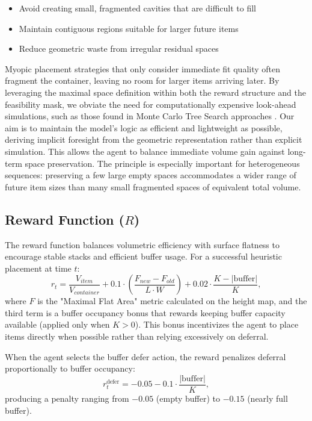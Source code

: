 \documentclass[runningheads]{llncs}
\begin{document}
\begin{itemize}

    \item Avoid creating small, fragmented cavities that are difficult to fill

    \item Maintain contiguous regions suitable for larger future items

    \item Reduce geometric waste from irregular residual spaces

\end{itemize}


Myopic placement strategies that only consider immediate fit quality often fragment the container, leaving no room for larger items arriving later. By leveraging the maximal space definition within both the reward structure and the feasibility mask, we obviate the need for computationally expensive look-ahead simulations, such as those found in Monte Carlo Tree Search approaches \cite{zhao}. Our aim is to maintain the model's logic as efficient and lightweight as possible, deriving implicit foresight from the geometric representation rather than explicit simulation. This allows the agent to balance immediate volume gain against long-term space preservation. The principle is especially important for heterogeneous sequences: preserving a few large empty spaces accommodates a wider range of future item sizes than many small fragmented spaces of equivalent total volume.

\subsection{Reward Function ($R$)}
The reward function balances volumetric efficiency with surface flatness to encourage stable stacks and efficient buffer usage. For a successful heuristic placement at time $t$:
\begin{equation}
    r_t = \frac{V_{item}}{V_{container}} + 0.1 \cdot \left( \frac{F_{new} - F_{old}}{L \cdot W} \right) + 0.02 \cdot \frac{K - |\text{buffer}|}{K},
\end{equation}
where $F$ is the "Maximal Flat Area" metric calculated on the height map, and the third term is a buffer occupancy bonus that rewards keeping buffer capacity available (applied only when $K > 0$). This bonus incentivizes the agent to place items directly when possible rather than relying excessively on deferral.

When the agent selects the buffer defer action, the reward penalizes deferral proportionally to buffer occupancy:
\begin{equation}
    r_t^{\text{defer}} = -0.05 - 0.1 \cdot \frac{|\text{buffer}|}{K},
\end{equation}
producing a penalty ranging from $-0.05$ (empty buffer) to $-0.15$ (nearly full buffer).
\end{document}
